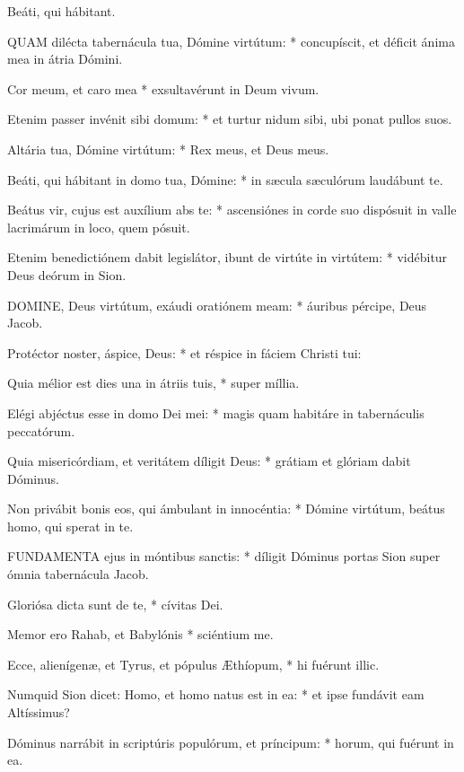  Beáti, qui hábitant.


\lettrine[lines=2]{Q}{UAM} dilécta tabernácula tua, Dómine virtútum: * concupíscit, et déficit ánima mea in átria Dómini.

Cor meum, et caro mea * exsultavérunt in Deum vivum.

Etenim passer invénit sibi domum: * et turtur nidum sibi, ubi ponat pullos suos.

Altária tua, Dómine virtútum: * Rex meus, et Deus meus.

Beáti, qui hábitant in domo tua, Dómine: * in sæcula sæculórum laudábunt te.

Beátus vir, cujus est auxílium abs te: * ascensiónes in corde suo dispósuit in valle lacrimárum in loco, quem pósuit.

Etenim benedictiónem dabit legislátor, ibunt de virtúte in virtútem: * vidébitur Deus deórum in Sion.


\lettrine[lines=2]{D}{OMINE}, Deus virtútum, exáudi oratiónem meam: * áuribus pércipe, Deus Jacob.

Protéctor noster, áspice, Deus: * et réspice in fáciem Christi tui:

Quia mélior est dies una in átriis tuis, * super míllia.

Elégi abjéctus esse in domo Dei mei: * magis quam habitáre in tabernáculis peccatórum.

Quia misericórdiam, et veritátem díligit Deus: * grátiam et glóriam dabit Dóminus.

Non privábit bonis eos, qui ámbulant in innocéntia: * Dómine virtútum, beátus homo, qui sperat in te.


\lettrine[lines=2]{F}{UNDAMENTA} ejus in móntibus sanctis: * díligit Dóminus portas Sion super ómnia tabernácula Jacob.

Gloriósa dicta sunt de te, * cívitas Dei.

Memor ero Rahab, et Babylónis * sciéntium me.

Ecce, alienígenæ, et Tyrus, et pópulus Æthíopum, * hi fuérunt illic.

Numquid Sion dicet: Homo, et homo natus est in ea: * et ipse fundávit eam Altíssimus?

Dóminus narrábit in scriptúris populórum, et príncipum: * horum, qui fuérunt in ea.

